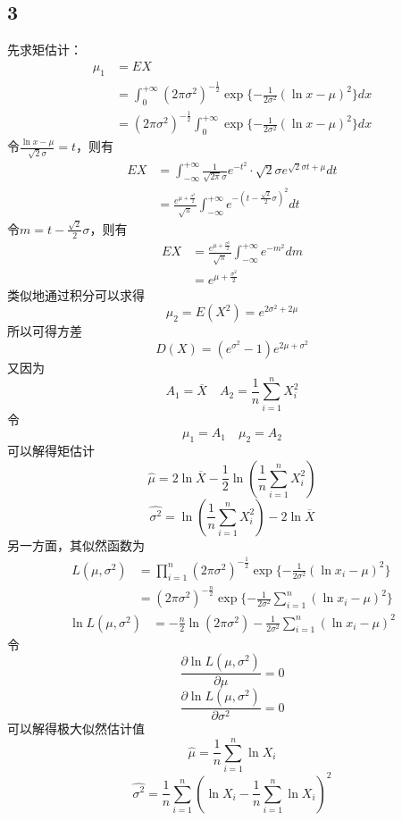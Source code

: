 \documentclass[twocolumn]{article}
\begin{document}
\begin{CJK}{UTF8}{gbsn}
			\subsection*{3}
				先求矩估计：\begin{align*}
					\mu_1 & = EX\\
					& = \int_{0}^{+\infty}(2\pi\sigma^2)^{-\frac{1}{2}}\exp\{-\frac{1}{2\sigma^2}(\ln x-\mu)^2\}dx\\
					& = (2\pi\sigma^2)^{-\frac{1}{2}}\int_{0}^{+\infty}\exp\{-\frac{1}{2\sigma^2}(\ln x-\mu)^2\}dx
				\end{align*}
				令$\frac{\ln x-\mu}{\sqrt{2}\sigma}=t$，则有\begin{align*}
					EX & = \int_{-\infty}^{+\infty}\frac{1}{\sqrt{2\pi}\sigma}e^{-t^2}\cdot\sqrt{2}\sigma e^{\sqrt{2}\sigma t+\mu}dt\\
					& = \frac{e^{\mu+\frac{\sigma^2}{2}}}{\sqrt{\pi}}\int_{-\infty}^{+\infty}e^{-(t-\frac{\sqrt{2}}{2}\sigma)^2}dt
				\end{align*}
				令$m = t-\frac{\sqrt{2}}{2}\sigma$，则有\begin{align*}
					EX & = \frac{e^{\mu+\frac{\sigma^2}{2}}}{\sqrt{\pi}}\int_{-\infty}^{+\infty}e^{-m^2}dm\\
					& = e^{\mu+\frac{\sigma^2}{2}}
				\end{align*}
				类似地通过积分可以求得\[\mu_2=E(X^2)=e^{2\sigma^2+2\mu}\]所以可得方差\[D(X)=(e^{\sigma^2}-1)e^{2\mu+\sigma^2}\]又因为\[A_1=\overline{X}\quad A_2=\frac{1}{n}\sum_{i=1}^{n}X_i^2\]令\[\mu_1=A_1\quad \mu_2=A_2\]可以解得矩估计\[\hat{\mu}=2\ln\overline{X}-\frac{1}{2}\ln(\frac{1}{n}\sum_{i=1}^{n}X_i^2)\]\[\hat{\sigma^2}=\ln(\frac{1}{n}\sum_{i=1}^{n}X_i^2)-2\ln\overline{X}\]另一方面，其似然函数为\begin{align*}
					L(\mu,\sigma^2) & = \prod_{i=1}^{n}(2\pi\sigma^2)^{-\frac{1}{2}}\exp\{-\frac{1}{2\sigma^2}(\ln x_i-\mu)^2\}\\
					& = (2\pi\sigma^2)^{-\frac{n}{2}}\exp\{-\frac{1}{2\sigma^2}\sum_{i=1}^{n}(\ln x_i-\mu)^2\}
				\end{align*}
				\begin{align*}
					\ln L(\mu,\sigma^2) & = -\frac{n}{2}\ln(2\pi\sigma^2)-\frac{1}{2\sigma^2}\sum_{i=1}^{n}(\ln x_i-\mu)^2
				\end{align*}
				令\[\frac{\partial\ln L(\mu,\sigma^2)}{\partial\mu}=0\]\[\frac{\partial\ln L(\mu,\sigma^2)}{\partial\sigma^2}=0\]可以解得极大似然估计值\[\hat{\mu}=\frac{1}{n}\sum_{i=1}^{n}\ln X_i\]\[\hat{\sigma^2}=\frac{1}{n}\sum_{i=1}^{n}(\ln X_i-\frac{1}{n}\sum_{i=1}^{n}\ln X_i)^2\]

\end{CJK}
\end{document}
